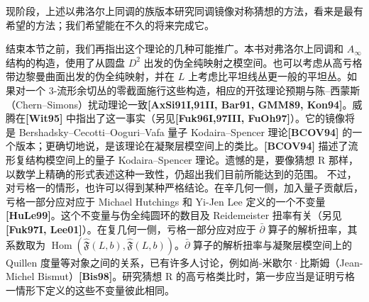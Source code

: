 现阶段，上述以弗洛尔上同调的族版本研究同调镜像对称猜想的方法，看来是最有希望的方法；我们希望能在不久的将来完成它。

结束本节之前，我们再指出这个理论的几种可能推广。本书对弗洛尔上同调和 $A_\infty$ 结构的构造，使用了从圆盘 $D^2$ 出发的伪全纯映射之模空间。也可以考虑从高亏格带边黎曼曲面出发的伪全纯映射，并在 $L$ 上考虑比平坦线丛更一般的平坦丛。如果对一个 $3$-流形余切丛的零截面施行这些构造，相应的开弦理论预期与陈--西蒙斯（Chern--Simons）扰动理论一致\textbf{[AxSi91I,91II, Bar91, GMM89, Kon94]}。威腾在\textbf{[Wit95]} 中指出了这一事实（另见\textbf{[Fuk96I,97III, FuOh97]}）。它的镜像将是 Bershadsky--Cecotti--Ooguri--Vafa 量子 Kodaira--Spencer 理论\textbf{[BCOV94]} 的一个版本；更确切地说，是该理论在凝聚层模空间上的类比。\textbf{[BCOV94]} 描述了流形复结构模空间上的量子 Kodaira--Spencer 理论。遗憾的是，要像猜想 R 那样，以数学上精确的形式表述这种一致性，仍超出我们目前所能达到的范围。
\enlargethispage{2\baselineskip}
不过，对亏格一的情形，也许可以得到某种严格结论。在辛几何一侧，加入量子贡献后，亏格一部分应对应于 Michael Hutchings 和 Yi-Jen Lee 定义的一个不变量\textbf{[HuLe99]}。这个不变量与伪全纯圆环的数目及 Reidemeister 扭率有关（另见\textbf{[Fuk97I, Lee01]}）。在复几何一侧，亏格一部分应对应于 $\bar\partial$ 算子的解析扭率，其系数取为
$\operatorname{Hom}(\hat{\mathfrak F}(L,b),\hat{\mathfrak F}(L,b))$。$\bar\partial$ 算子的解析扭率与凝聚层模空间上的 Quillen 度量等对象之间的关系，已有许多人讨论，例如尚-米歇尔·比斯姆（Jean-Michel Bismut）\textbf{[Bis98]}。研究猜想 R 的高亏格类比时，第一步应当是证明亏格一情形下定义的这些不变量彼此相同。
